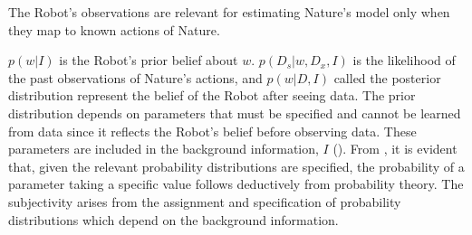 \begin{axiom}
	\label{ax:observation_relevance}
	The Robot's observations are relevant for estimating Nature's model only when they map to known actions of Nature.
\end{axiom}

$p(w|I)$ is the Robot's prior belief about $w$. $p(D_s|w,D_x,I)$ is the likelihood of the past observations of Nature's actions, and $p(w|D,I)$ called the posterior distribution represent the belief of the Robot after seeing data. The prior distribution depends on parameters that must be specified and cannot be learned from data since it reflects the Robot's belief before observing data. These parameters are included in the background information, $I$ (). From , it is evident that, given the relevant probability distributions are specified, the probability of a parameter taking a specific value follows deductively from probability theory. The subjectivity arises from the assignment and specification of probability distributions which depend on the background information.

\newpage
